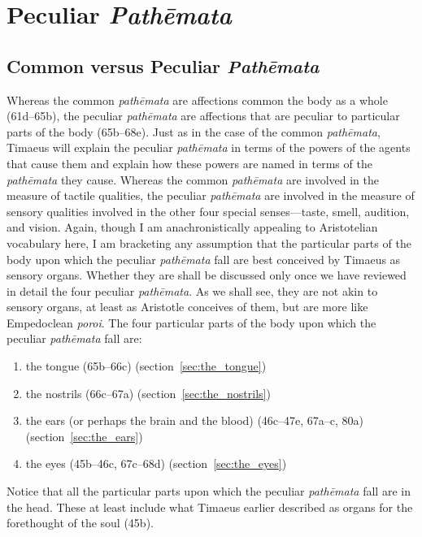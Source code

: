 
\chapter{Peculiar \emph{Pathēmata}} %
\label{cha:peculiar_pathemata}

\section{Common versus Peculiar \emph{Pathēmata}} %
\label{sec:common_versus_peculiar_pathemata}

Whereas the common \emph{pathēmata} are affections common the body as a whole (61d--65b), the peculiar \emph{pathēmata} are affections that are peculiar to particular parts of the body (65b--68e). Just as in the case of the common \emph{pathēmata}, Timaeus will explain the peculiar \emph{pathēmata} in terms of the powers of the agents that cause them and explain how these powers are named in terms of the \emph{pathēmata} they cause. Whereas the common \emph{pathēmata} are involved in the measure of tactile qualities, the peculiar \emph{pathēmata} are involved in the measure of sensory qualities involved in the other four special senses---taste, smell, audition, and vision. Again, though I am anachronistically appealing to Aristotelian vocabulary here, I am bracketing any assumption that the particular parts of the body upon which the peculiar \emph{pathēmata} fall are best conceived by Timaeus as sensory organs. Whether they are shall be discussed only once we have reviewed in detail the four peculiar \emph{pathēmata}. As we shall see, they are not akin to sensory organs, at least as Aristotle conceives of them, but are more like Empedoclean \emph{poroi}. The four particular parts of the body upon which the peculiar \emph{pathēmata} fall are:
\begin{enumerate}
	\item the tongue (65b--66c) (section~\ref{sec:the_tongue})
	\item the nostrils (66c--67a) (section~\ref{sec:the_nostrils})
	\item the ears (or perhaps the brain and the blood) (46c--47e, 67a--c, 80a) (section~\ref{sec:the_ears})
	\item the eyes (45b--46c, 67c--68d) (section~\ref{sec:the_eyes})
\end{enumerate}
Notice that all the particular parts upon which the peculiar \emph{pathēmata} fall are in the head. These at least include what Timaeus earlier described as organs for the forethought of the soul (45b).

